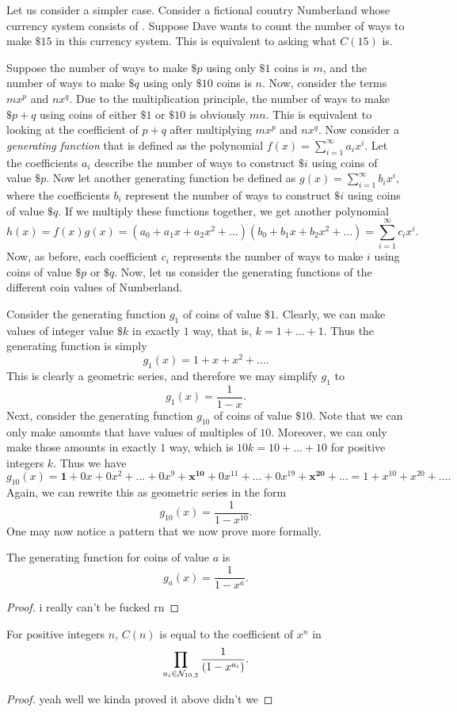 \documentclass{article}
\begin{document}
Let us consider a simpler case. Consider a fictional country Numberland whose currency system consists of \NTen. Suppose Dave wants to count the number of ways to make  $\$ 15$ in this currency system. This is equivalent to asking what $C(15)$ is.

Suppose the number of ways to make $\$ p$ using only $\$ 1$ coins is $m$, and the number of ways to make $\$ q$ using only $\$ 10$ coins is $n$. Now, consider the terms $mx^{p}$ and $nx^{q}$. Due to the multiplication principle, the number of ways to make $\$ p+q$ using coins of either $\$ 1$ or $\$ 10$ is obviously $mn$. This is equivalent to looking at the coefficient of $p+q$ after multiplying $mx^{p}$ and $nx^{q}$.
Now consider a \emph{generating function} that is defined as the polynomial $f(x) = \sum_{i=1}^{\infty} a_i x^i$. Let the coefficients $a_i$ describe the number of ways to construct $\$ i$ using coins of value $\$ p$. Now let another generating function be defined as $g(x) = \sum_{i=1}^{\infty} b_i x^i$, where the coefficients $b_i$ represent the number of ways to construct $\$ i$ using coins of value $\$ q$. If we multiply these functions together, we get another polynomial \[
  h(x) = f(x)g(x) = (a_0 + a_1x + a_2x^2 + \dots)(b_0 + b_1x + b_2x^2 + \dots) = \sum_{i=1}^{\infty} c_ix^{i}
.\] Now, as before, each coefficient $c_i$ represents the number of ways to make $i$ using coins of value $\$ p$ or $\$ q$. Now, let us consider the generating functions of the different coin values of Numberland.

Consider the generating function $g_1$ of coins of value $\$ 1$. Clearly, we can make values of integer value $\$ k$ in exactly $1$ way, that is, $k = 1 + \dots + 1$. Thus the generating function is simply \[
  g_{1}(x) = 1 + x + x^2 + \dots
.\] This is clearly a geometric series, and therefore we may simplify $g_1$ to \[
  g_1(x) = \frac{1}{1-x}
.\] Next, consider the generating function $g_{10}$ of coins of value $\$ 10$. Note that we can only make amounts that have values of multiples of  $10$. Moreover, we can only make those amounts in exactly $1$ way, which is $10k = 10 + \dots + 10$ for positive integers $k$. Thus we have \[
g_{10}(x) = \bm{1} + 0x + 0x^2 + \dots + 0x^{9} + \bm{x^{10}} + 0x^{11} + \dots + 0x^{19} + \bm{x^{20}} + \dots = 1 + x^{10} + x^{20} + \dots
.\] Again, we can rewrite this as geometric series in the form \[
  g_{10}(x) = \frac{1}{1-x^{10}}
.\] One may now notice a pattern that we now prove more formally.
\begin{theorem}
  The generating function for coins of value $a$ is \[
    g_a(x) = \frac{1}{1-x^a}
  .\] 
\end{theorem}
\begin{proof}
  i really can't be fucked rn
\end{proof}
\begin{theorem}
  For positive integers $n$, $C(n)$ is equal to the coefficient of $x^{n}$ in \[
    \prod_{a_i \in \mathcal{N}_{10, 2}} \frac{1}{(1-x^{a_i})}
  .\] 
\end{theorem}
\begin{proof}
  yeah well we kinda proved it above didn't we
\end{proof}
\end{document}
